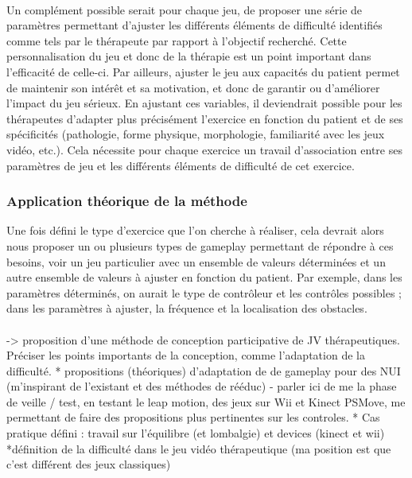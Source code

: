 \paragraph{}Un complément possible serait pour chaque jeu, de proposer une série de paramètres permettant d’ajuster les différents éléments de difficulté identifiés comme tels par le thérapeute par rapport à l’objectif recherché. Cette personnalisation du jeu et donc de la thérapie est un point important dans l’efficacité de celle-ci. Par ailleurs, ajuster le jeu aux capacités du patient permet de maintenir son intérêt et sa motivation, et donc de garantir ou d’améliorer l’impact du jeu sérieux. En ajustant ces variables, il deviendrait possible pour les thérapeutes d’adapter plus précisément l’exercice en fonction du patient et de ses spécificités (pathologie, forme physique, morphologie, familiarité avec les jeux vidéo, etc.). Cela nécessite pour chaque exercice un travail d’association entre ses paramètres de jeu et les différents éléments de difficulté de cet exercice.

	\subsubsection*{Application théorique de la méthode}
Une fois défini le type d'exercice que l’on cherche à réaliser, cela devrait alors nous proposer un ou plusieurs types de gameplay permettant de répondre à ces besoins, voir un jeu particulier avec un ensemble de valeurs déterminées et un autre ensemble de valeurs à ajuster en fonction du patient. Par exemple, dans les paramètres déterminés, on aurait le type de contrôleur et les contrôles possibles ; dans les paramètres à ajuster, la fréquence et la localisation des obstacles.

\paragraph{}
-> proposition d'une méthode de conception participative de JV thérapeutiques. Préciser les points importants de la conception, comme l'adaptation de la difficulté.
* propositions (théoriques) d'adaptation de de gameplay pour des NUI (m'inspirant de l'existant et des méthodes de rééduc)
	- parler ici de me la phase de veille / test, en testant le leap motion, des jeux sur Wii et Kinect PSMove, me permettant de faire des propositions plus pertinentes sur les controles.
* Cas pratique défini : travail sur l'équilibre (et lombalgie) et devices (kinect et wii)
*définition de la difficulté dans le jeu vidéo thérapeutique (ma position est que c'est différent des jeux classiques)